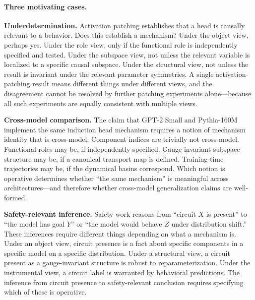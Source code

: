 \documentclass[11pt]{article}
\theoremstyle{remark}
\begin{document}
\paragraph{Three motivating cases.}

\textbf{Underdetermination.}  Activation patching establishes that a
head is causally relevant to a behavior.  Does this establish a
mechanism?  Under the object view, perhaps yes.  Under the role view,
only if the functional role is independently specified and tested.
Under the subspace view, not unless the relevant variable is localized
to a specific causal subspace.  Under the structural view, not unless
the result is invariant under the relevant parameter symmetries.  A
single activation-patching result means different things under different
views, and the disagreement cannot be resolved by further patching
experiments alone---because all such experiments are equally consistent
with multiple views.

\textbf{Cross-model comparison.}  The claim that GPT-2 Small and
Pythia-160M implement the same induction head mechanism requires a
notion of mechanism identity that is cross-model.  Component indices are
trivially not cross-model.  Functional roles may be, if independently
specified.  Gauge-invariant subspace structure may be, if a canonical
transport map is defined.  Training-time trajectories may be, if the
dynamical basins correspond.  Which notion is operative determines
whether ``the same mechanism'' is meaningful across architectures---and
therefore whether cross-model generalization claims are well-formed.

\textbf{Safety-relevant inference.}  Safety work reasons from ``circuit
$X$ is present'' to ``the model has goal $Y$'' or ``the model would
behave $Z$ under distribution shift.''  These inferences require
different things depending on what a mechanism is.  Under an object view,
circuit presence is a fact about specific components in a specific model
on a specific distribution.  Under a structural view, a circuit present
as a gauge-invariant structure is robust to reparameterization.  Under
the instrumental view, a circuit label is warranted by behavioral
predictions.  The inference from circuit presence to safety-relevant
conclusion requires specifying which of these is operative.
\end{document}
